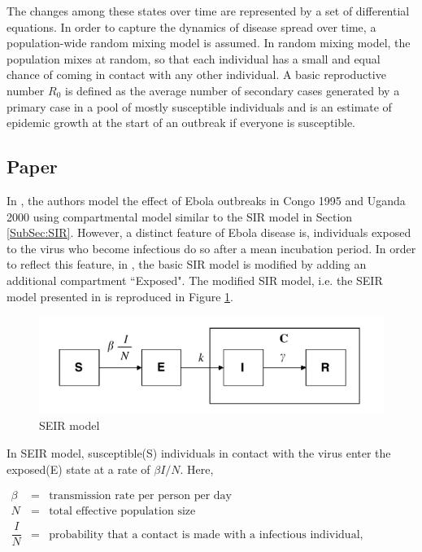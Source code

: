 \documentclass[12pt, journal,onecolumn]{IEEEtran}
\begin{document}
The changes among these states over time are represented by a set of differential equations. In order to capture the dynamics of disease spread over time, a population-wide random mixing model is assumed. In random mixing model, the population mixes at random, so that each individual has a small and equal chance of coming in contact with any other individual. A basic reproductive number $R_0$ is defined as the average number of secondary cases generated by a primary case in a pool of mostly susceptible individuals and is an estimate of epidemic growth at the start of an outbreak if everyone is susceptible.


\subsection{\textbf{Paper \citep{chowell2004basic}}}

In \citep{chowell2004basic}, the authors model the effect of Ebola outbreaks in Congo 1995 and Uganda
2000 using compartmental model similar to the SIR model in Section \ref{SubSec:SIR}. However, a
distinct feature of Ebola disease is, individuals exposed to the virus who become infectious do so
after a mean incubation period. In order to reflect this feature, in \citep{chowell2004basic}, the
basic SIR model is modified by adding an additional compartment ``Exposed". The modified SIR model,
i.e. the SEIR model presented in \citep{chowell2004basic} is reproduced in
Figure \ref{fig:SEIR_model}.

\begin{figure}[h!]
\captionsetup{justification=centering}
\includegraphics[scale=0.5]{seir_model_fig}
\centering\caption{SEIR model}
\label{fig:SEIR_model}
\end{figure}

In SEIR model, susceptible(S) individuals in contact with the virus enter the exposed(E) state at a rate of $\beta I / N$. Here,

\begin{eqnarray*}
\beta &=& \text{transmission rate per person per day}\\
N &=& \text{total effective population size}\\
\dfrac{I}{N} &=& \text{probability that a contact is made with a infectious individual, assuming random uniform mixing}
\end{eqnarray*}
\end{document}
